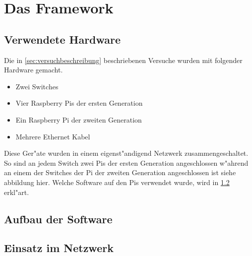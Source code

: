 \chapter{Das Framework}
\label{cha:framework}
\section{Verwendete Hardware} \label{sec:verwendeteHardware}
Die in \cref{sec:versuchbeschreibung} beschriebenen Versuche wurden mit folgender Hardware gemacht. %
\begin{itemize}
\item Zwei Switches
\item Vier Raspberry Pis der ersten Generation
\item Ein Raspberry Pi der zweiten Generation
\item Mehrere Ethernet Kabel
\end{itemize}
Diese Ger"ate wurden in einem eigenst"andigend Netzwerk zusammengeschaltet. So sind an jedem Switch zwei Pis %
der ersten Generation angeschlossen w"ahrend an einem der Switches der Pi der zweiten Generation angeschlossen %
ist siehe abbildung hier. Welche Software auf den Pis verwendet wurde, wird in \cref{sec:aufbauSoftware} erkl"art. 
\section{Aufbau der Software} \label{sec:aufbauSoftware}

\section{Einsatz im Netzwerk} 
\label{sec:einsatzImNetzwerk}

